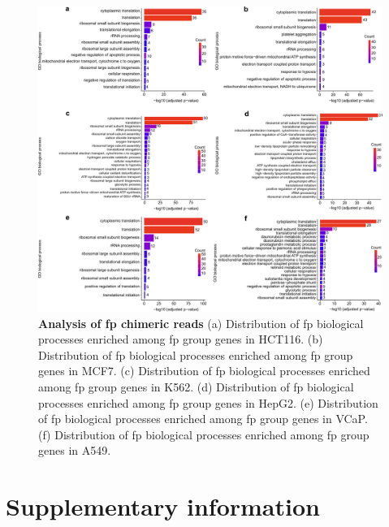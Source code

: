 \documentclass[pdflatex, sn-mathphys-num, lineno]{sn-jnl}%
\theoremstyle{thmstyleone}%
\theoremstyle{thmstyletwo}%
\theoremstyle{thmstylethree}%
\begin{document}
\begin{figure}[!h]
	\includegraphics[height=0.87\columnwidth]{finals/sf4}
	\caption{ {\bf  Analysis of \gls{fp} chimeric reads } (a) Distribution of \gls{fp} biological processes enriched among \gls{fp} group genes in HCT116. (b) Distribution of \gls{fp} biological processes enriched among \gls{fp} group genes in MCF7. (c) Distribution of \gls{fp} biological processes enriched among \gls{fp} group genes in K562. (d) Distribution of \gls{fp} biological processes enriched among \gls{fp} group genes in HepG2. (e) Distribution of \gls{fp} biological processes enriched among \gls{fp} group genes in VCaP. (f) Distribution of \gls{fp} biological processes enriched among \gls{fp} group genes in A549.}
	\label{fig:sf2}
\end{figure}



\newpage

\section{Supplementary information}

\renewcommand{\figurename}{Supplementary Fig.}
\renewcommand{\tablename}{Supplementary Table}


\end{document}
